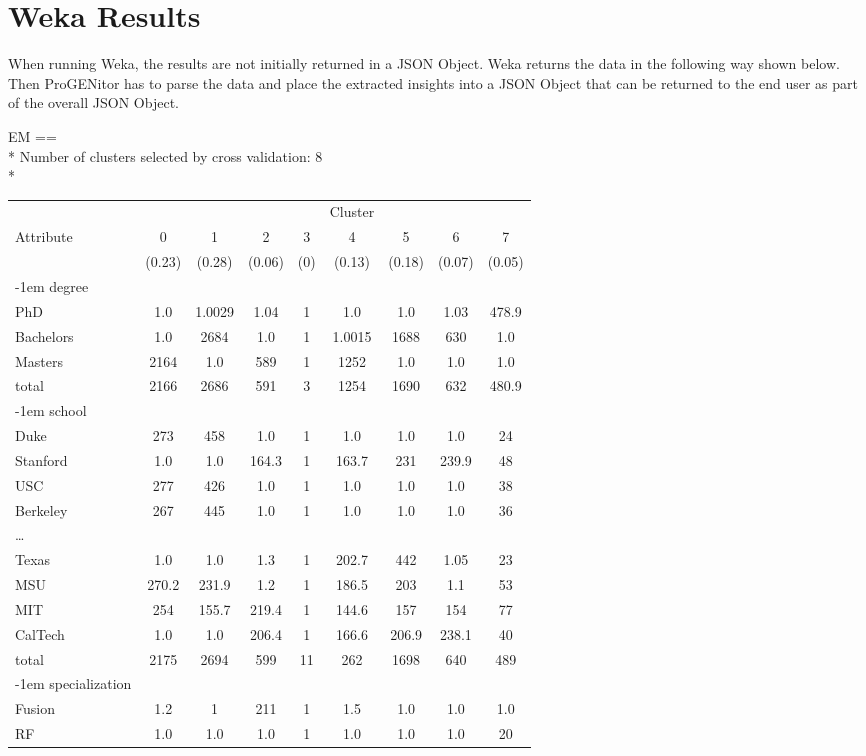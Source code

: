 \section{Weka Results}
\label{sect:weka-results}
When running Weka, the results are not initially returned in a JSON Object. 
Weka returns the data in the following way shown below.  Then ProGENitor has to
parse the data and place the extracted insights into a JSON Object that can be
returned to the end user as part of the overall JSON Object.

\pagebreak 
\begin{tt}
\begin{footnotesize}
\noindent EM
\noindent ==\\*
\noindent Number of clusters selected by cross validation: 8\\*                           
\begin{tabular}{lcccccccc} 
&&&&&Cluster\\
Attribute&0&1&2&3&4&5&6&7\\
&(0.23)&(0.28)&(0.06)&(0)&(0.13)&(0.18)&(0.07)&(0.05)\\
\kern-1em degree\\
PhD&1.0&1.0029&1.04&1&1.0&1.0&1.03&478.9\\
Bachelors&1.0&2684&1.0&1&1.0015&1688&630&1.0\\
Masters&2164&1.0&589&1&1252&1.0&1.0&1.0\\
total&2166&2686&591&3&1254&1690&632&480.9\\
\kern-1em school\\
Duke&273&458&1.0&1&1.0&1.0&1.0&24\\
Stanford&1.0&1.0&164.3&1&163.7&231&239.9&48\\
USC&277&426&1.0&1&1.0&1.0&1.0&38\\
Berkeley&267&445&1.0&1&1.0&1.0&1.0&36\\
\ldots&&&&&&&&\\
Texas&1.0&1.0&1.3&1&202.7&442&1.05&23\\ 
MSU&270.2&231.9&1.2&1&186.5&203&1.1&53\\
MIT&254&155.7&219.4&1&144.6&157&154&77\\
CalTech&1.0&1.0&206.4&1&166.6&206.9&238.1&40\\ 
total&2175&2694&599&11&262&1698&640&489\\
\kern-1em specialization\\ 
Fusion&1.2&1&211&1&1.5&1.0&1.0&1.0\\ 
RF&1.0&1.0&1.0&1&1.0&1.0&1.0&20\\ 

\end{tabular}
\end{footnotesize}
\end{tt}
